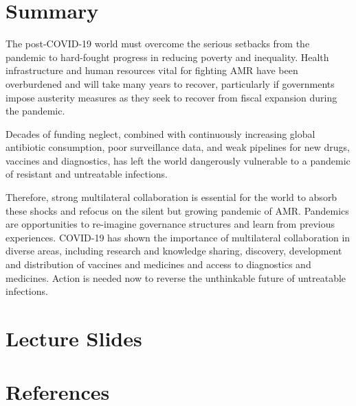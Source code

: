 \documentclass[
]{book}
\begin{document}
\hypertarget{summary}{%
\section*{Summary}\label{summary}}

The post-COVID-19 world must overcome the serious setbacks from the pandemic to hard-fought progress in reducing poverty and inequality. Health infrastructure and human resources vital for fighting AMR have been overburdened and will take many years to recover, particularly if governments impose austerity measures as they seek to recover from fiscal expansion during the pandemic.

Decades of funding neglect, combined with continuously increasing global antibiotic consumption, poor surveillance data, and weak pipelines for new drugs, vaccines and diagnostics, has left the world dangerously vulnerable to a pandemic of resistant and untreatable infections.

Therefore, strong multilateral collaboration is essential for the world to absorb these shocks and refocus on the silent but growing pandemic of AMR. Pandemics are opportunities to re-imagine governance structures and learn from previous experiences. COVID-19 has shown the importance of multilateral collaboration in diverse areas, including research and knowledge sharing, discovery, development and distribution of vaccines and medicines and access to diagnostics and medicines. Action is needed now to reverse the unthinkable future of untreatable infections.

\hypertarget{lecture-slides}{%
\section*{Lecture Slides}\label{lecture-slides}}

\hypertarget{references}{%
\section*{References}\label{references}}
\end{document}
